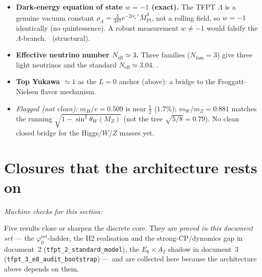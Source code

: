 \documentclass[11pt,a4paper]{article}
\newcommand{\Mbar}{\bar M_{\mathrm{Pl}}}
\newcommand{\Nfam}{N_{\mathrm{fam}}}
\newcommand{\phiz}{\varphi_0^{\mathrm{ret}}}
\newcommand{\ainv}{\alpha^{-1}_\star}
\theoremstyle{definition}
\begin{document}
\begin{itemize}[leftmargin=1.5em]
\item \textbf{Dark-energy equation of state $w=-1$ (exact).} The TFPT $\Lambda$ is a genuine vacuum
constant $\rho_\Lambda=\tfrac{3}{4\pi^2}e^{-2\ainv}\Mbar^4$, not a rolling field, so $w=-1$ identically
(no quintessence). A robust measurement $w\neq-1$ would falsify the $\Lambda$-branch. \mE\ (structural).
\item \textbf{Effective neutrino number $N_{\mathrm{eff}}\simeq3$.} Three families ($\Nfam=3$) give
three light neutrinos and the standard $N_{\mathrm{eff}}\simeq3.04$. \mE.
\item \textbf{Top Yukawa $\simeq1$} as the $L=0$ anchor (above): a bridge to the Froggatt--Nielsen
flavor mechanism.
\item \emph{Flagged (not clean):} $m_H/v=0.509$ is near $\tfrac12$ ($1.7\%$); $m_W/m_Z=0.881$ matches
the running $\sqrt{1-\sin^2\theta_W(M_Z)}$ (not the tree $\sqrt{5/8}=0.79$). No clean closed bridge
for the Higgs/$W$/$Z$ masses yet. \mO
\end{itemize}

\section{Closures that the architecture rests on}
\noindent\emph{Machine checks for this section:}  

Five results close or sharpen the discrete core. They are \emph{proved in this document set} --- the
$\phiz$-ladder, the H2 realisation and the strong-CP/dynamics gap in document~2
(\texttt{tfpt\_2\_standard\_model}), the $E_6{\times}A_2$ shadow in document~3
(\texttt{tfpt\_3\_e8\_audit\_bootstrap}) --- and are collected here because the architecture above
depends on them.
\end{document}
